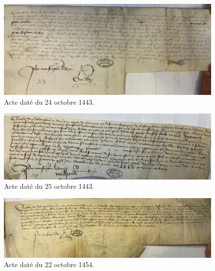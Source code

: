 \begin{figure}[ht]
\centering
\includegraphics[scale =0.12]{front/images/IMG-2573.jpg}
\caption*{Acte daté du 24 octobre 1443.}
\label{IMG-2573}
\end{figure}

\begin{figure}[ht]
\centering
\includegraphics[scale =0.12]{front/images/IMG-2558.jpg}
\caption*{Acte daté du 25 octobre 1443.}
\label{IMG-2558}
\end{figure}

\begin{figure}[ht]
\centering
\includegraphics[scale =0.12]{front/images/IMG-2547.jpg}
\caption*{Acte daté du 22 octobre 1454.}
\label{IMG-2547}
\end{figure}
